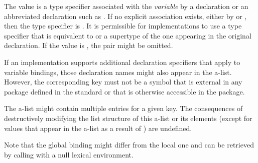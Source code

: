 \begin{defun}[Function]
\begin{indentdesc}{7pc}
\item[\cdf{type}]
The value is a type specifier associated with the \emph{variable} by a 
                declaration or an abbreviated declaration such as
                .
                If no explicit association exists, either by  or
                , then the type specifier is .  It is permissible for
                implementations to use a type specifier that is equivalent
                to or a supertype of the one appearing in the original
                declaration.  If the value is , the pair might be
                omitted.
\end{indentdesc}
  If an implementation supports additional declaration specifiers that
  apply to variable bindings, those declaration names might also
  appear in the a-list.  However, the corresponding key must not
  be a symbol that is external in any package defined in the standard
  or that is otherwise accessible in the  package.

  The a-list might contain multiple entries for a given key.
  The consequences of destructively modifying the list
  structure of this a-list or its elements (except for values that 
  appear in the a-list as a result of ) are undefined.

  Note that the global binding might differ from the
  local one and can be retrieved by calling 
  with a null lexical environment.
\end{defun}

